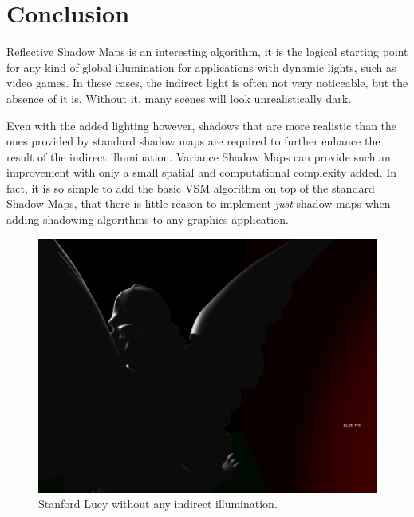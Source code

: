 \documentclass{acmsiggraph}               %
\begin{document}
\section{Conclusion}
Reflective Shadow Maps is an interesting algorithm, it is the logical starting point for any kind of global illumination for applications with dynamic lights, such as video games. In these cases, the indirect light is often not very noticeable, but the absence of it is. Without it, many scenes will look unrealistically dark.

Even with the added lighting however, shadows that are more realistic than the ones provided by standard shadow maps are required to further enhance the result of the indirect illumination. Variance Shadow Maps can provide such an improvement with only a small spatial and computational complexity added. In fact, it is so simple to add the basic VSM algorithm on top of the standard Shadow Maps, that there is little reason to implement \emph{just} shadow maps when adding shadowing algorithms to any graphics application.

\newpage

\begin{figure}[p]
    \centering
    \includegraphics[width=1.0\columnwidth]{./images/p2-A.png}
    \caption{Stanford Lucy without any indirect illumination.}
    \label{fig:ang1}
\end{figure}
\end{document}
